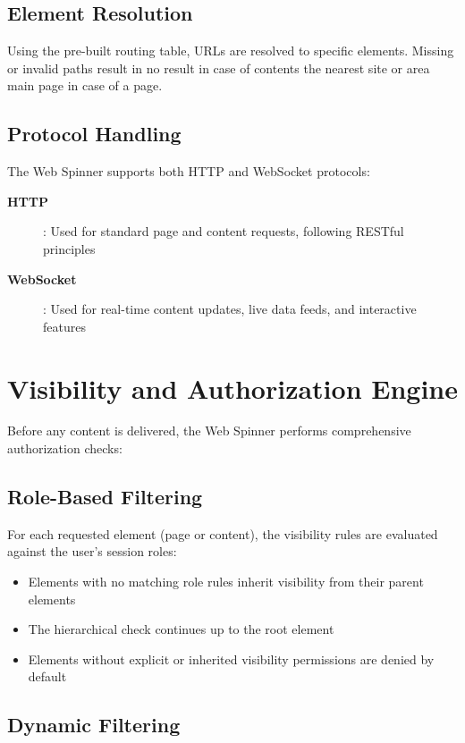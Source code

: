 \subsection{Element Resolution}

Using the pre-built routing table, URLs are resolved to specific \wbdl{} elements. Missing or invalid paths result in no result in case of contents the nearest site or area main page in case of a page.

\subsection{Protocol Handling}

The Web Spinner supports both HTTP and WebSocket protocols:
\begin{description}
	\item[\textbf{HTTP}]: Used for standard page and content requests, following RESTful principles
	\item[\textbf{WebSocket}]: Used for real-time content updates, live data feeds, and interactive features
\end{description}

\section{Visibility and Authorization Engine}
\label{sec:authorization-engine}

Before any content is delivered, the Web Spinner performs comprehensive authorization checks:

\subsection{Role-Based Filtering}

For each requested element (page or content), the visibility rules are evaluated against the user's session roles:
\begin{itemize}
	\item Elements with no matching role rules inherit visibility from their parent elements
	\item The hierarchical check continues up to the root element
	\item Elements without explicit or inherited visibility permissions are denied by default
\end{itemize}

\subsection{Dynamic Filtering}

